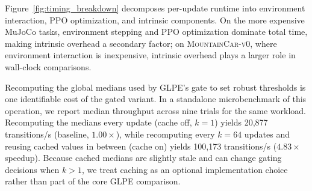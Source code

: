 Figure~\ref{fig:timing_breakdown} decomposes per-update runtime into environment interaction, PPO optimization, and intrinsic components.
On the more expensive MuJoCo tasks, environment stepping and PPO optimization dominate total time, making intrinsic overhead a secondary factor; on \textsc{MountainCar-v0}, where environment interaction is inexpensive, intrinsic overhead plays a larger role in wall-clock comparisons.



Recomputing the global medians used by GLPE's gate to set robust thresholds is one identifiable cost of the gated variant.
In a standalone microbenchmark of this operation, we report median throughput across nine trials for the same workload.
Recomputing the medians every update (cache off, $k{=}1$) yields 20{,}877 transitions/s (baseline, $1.00\times$), while recomputing every $k{=}64$ updates and reusing cached values in between (cache on) yields 100{,}173 transitions/s ($4.83\times$ speedup).
Because cached medians are slightly stale and can change gating decisions when $k>1$, we treat caching as an optional implementation choice rather than part of the core GLPE comparison.
